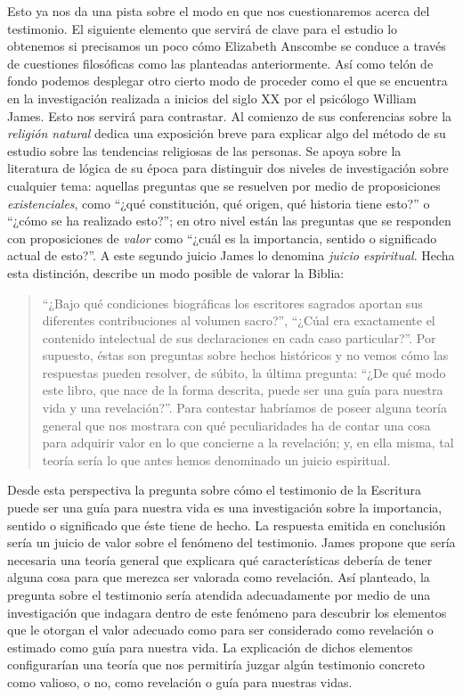 Esto ya nos da una pista sobre el modo en que nos cuestionaremos acerca del
testimonio. El siguiente elemento que servirá de clave para el estudio lo
obtenemos si precisamos un poco cómo Elizabeth Anscombe se conduce a través de
cuestiones filosóficas como las planteadas anteriormente. Así como telón de
fondo podemos desplegar otro cierto modo de proceder como el que se encuentra en
la investigación realizada a inicios del siglo XX por el psicólogo William
James. Esto nos servirá para contrastar. Al comienzo de sus conferencias sobre
la \emph{religión natural} dedica una exposición breve para explicar algo del
método de su estudio sobre las tendencias religiosas de las personas. Se apoya
sobre la literatura de lógica de su época para distinguir dos niveles de
investigación sobre cualquier tema: aquellas preguntas que se resuelven por
medio de proposiciones \emph{existenciales}, como \enquote{¿qué constitución,
  qué origen, qué historia tiene esto?} o \enquote{¿cómo se ha realizado esto?};
en otro nivel están las preguntas que se responden con proposiciones de
\emph{valor} como \enquote{¿cuál es la importancia, sentido o significado actual
  de esto?}. A este segundo juicio James lo denomina \emph{juicio espiritual}.
Hecha esta distinción, describe un modo posible de valorar la Biblia:

\blockquote[{\cite[27]{james2002variedades}}]{\enquote{¿Bajo qué condiciones
    biográficas los escritores sagrados aportan sus diferentes contribuciones al
    volumen sacro?}, \enquote{¿Cúal era exactamente el contenido intelectual de
    sus declaraciones en cada caso particular?}. Por supuesto, éstas son
  preguntas sobre hechos históricos y no vemos cómo las respuestas pueden
  resolver, de súbito, la última pregunta: \enquote{¿De qué modo este libro, que
    nace de la forma descrita, puede ser una guía para nuestra vida y una
    revelación?}. Para contestar habríamos de poseer alguna teoría general que
  nos mostrara con qué peculiaridades ha de contar una cosa para adquirir valor
  en lo que concierne a la revelación; y, en ella misma, tal teoría sería lo que
  antes hemos denominado un juicio espiritual.}

Desde esta perspectiva la pregunta sobre cómo el testimonio de la Escritura
puede ser una guía para nuestra vida es una investigación sobre la importancia,
sentido o significado que éste tiene de hecho. La respuesta emitida en
conclusión sería un juicio de valor sobre el fenómeno del testimonio. James
propone que sería necesaria una teoría general que explicara qué características
debería de tener alguna cosa para que merezca ser valorada como revelación. Así
planteado, la pregunta sobre el testimonio sería atendida adecuadamente por
medio de una investigación que indagara dentro de este fenómeno para descubrir
los elementos que le otorgan el valor adecuado como para ser considerado como
revelación o estimado como guía para nuestra vida. La explicación de dichos
elementos configurarían una teoría que nos permitiría juzgar algún testimonio
concreto como valioso, o no, como revelación o guía para nuestras vidas.

